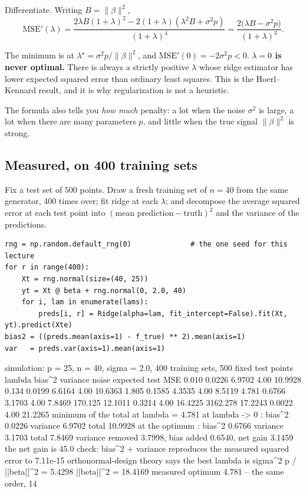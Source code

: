 \documentclass[11pt]{article}
\begin{document}
Differentiate. Writing $B = \|\beta\|^2$,
\[
  \mathrm{MSE}'(\lambda)
  = \frac{2\lambda B (1+\lambda)^2 - 2(1+\lambda)(\lambda^2 B + \sigma^2 p)}
         {(1+\lambda)^4}
  = \frac{2\big(\lambda B - \sigma^2 p\big)}{(1+\lambda)^3} .
\]

\begin{keyidea}
The minimum is at $\lambda^\star = \sigma^2 p / \|\beta\|^2$, and
$\mathrm{MSE}'(0) = -2\sigma^2 p < 0$. \textbf{$\lambda = 0$ is never optimal.}
There is always a strictly positive $\lambda$ whose ridge estimator has lower
expected squared error than ordinary least squares. This is the
Hoerl--Kennard result, and it is why regularization is not a heuristic.
\end{keyidea}

The formula also tells you \emph{how much} penalty: a lot when the noise
$\sigma^2$ is large, a lot when there are many parameters $p$, and little when
the true signal $\|\beta\|^2$ is strong.

\subsection{Measured, on 400 training sets}

Fix a test set of $500$ points. Draw a fresh training set of $n = 40$ from the
same generator, $400$ times over; fit ridge at each $\lambda$; and decompose
the average squared error at each test point into
$(\text{mean prediction} - \text{truth})^2$ and the variance of the
predictions.

\begin{lstlisting}
rng = np.random.default_rng(0)              # the one seed for this lecture
for r in range(400):
    Xt = rng.normal(size=(40, 25))
    yt = Xt @ beta + rng.normal(0, 2.0, 40)
    for i, lam in enumerate(lams):
        preds[i, r] = Ridge(alpha=lam, fit_intercept=False).fit(Xt, yt).predict(Xte)
bias2 = ((preds.mean(axis=1) - f_true) ** 2).mean(axis=1)
var   = preds.var(axis=1).mean(axis=1)
\end{lstlisting}
\begin{codeout}
simulation: p = 25, n = 40, sigma = 2.0, 400 training sets, 500 fixed test points
  lambda      bias^2   variance   noise   expected test MSE
      0.010    0.0226     6.9702    4.00     10.9928
      0.134    0.0199     6.6164    4.00     10.6363
      1.805    0.1585     4.3535    4.00      8.5119
      4.781    0.6766     3.1703    4.00      7.8469
    170.125   12.1011     0.3214    4.00     16.4225
   3162.278   17.2243     0.0022    4.00     21.2265
  minimum of the total at lambda = 4.781
  at lambda -> 0   : bias^2 0.0226  variance   6.9702  total   10.9928
  at the optimum   : bias^2 0.6766  variance   3.1703  total    7.8469
  variance removed 3.7998, bias added 0.6540, net gain 3.1459
  the net gain is 45.0%
  check: bias^2 + variance reproduces the measured squared error to 7.11e-15
  orthonormal-design theory says the best lambda is sigma^2 p / ||beta||^2 = 5.4298
  ||beta||^2 = 18.4169
  measured optimum 4.781 -- the same order, 14%
\end{codeout}
\end{document}
